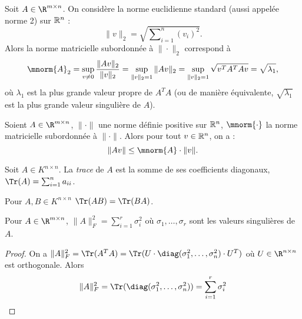 \begin{example}
	Soit $A \in \R^{m \times n}$. On considère la norme euclidienne standard (aussi appelée norme 2) sur $\Bbb R^n$ : 
	$$\| v \|_2 = \sqrt{\sum\nolimits_{i=1}^n (v_i)^2}.$$
	Alors la norme matricielle subordonnée à $\|\cdot\|_2$ correspond à
	\begin{displaymath}
    	\mnorm{A}_2 = \sup_{v \neq 0} \frac{\|Av\|_2}{\|v\|_2} = \sup_{\|v\|_2 = 1} \|Av\|_2 = \sup_{\|v\|_2 = 1} \sqrt{v^T A^T A v} = \sqrt{\lambda_1},
  	\end{displaymath}
  	où $\lambda_1$ est la plus grande valeur propre de $A^T A$ (ou de manière équivalente, $\sqrt{\lambda_1}$ est la plus grande valeur singulière de $A$).
\end{example}

\begin{exercise}
	Soient $A \in \R^{m \times n}$, $\|\cdot\|$ une norme définie positive sur $\Bbb R^n$, $\mnorm{\cdot}$ la norme matricielle subordonnée à $\|\cdot\|$. Alors pour tout $v \in \Bbb R^n$, on a : 
	\begin{displaymath}
		\|Av\| \leq \mnorm{A} \cdot \|v\|.
	\end{displaymath}
\end{exercise}

\begin{definition}
  \label{def:27}
  Soit $A \in K^{n \times n}$. La \emph{trace} de $A$ est la somme de ses coefficients diagonaux, $\Tr(A) = \sum_{i=1}^n a_{ii}$. 
\end{definition}

\begin{lemma}
  \label{lem:11}
  Pour $A,B \in K^{n \times n}$ $\Tr(AB) = \Tr(BA)$. 
\end{lemma}


\begin{lemma}
  \label{lem:10}
  Pour $A \in \R^{m \times n}$, $\|A\|_F^2 = \sum_{i=1}^r \sigma_i^2$ où $\sigma_1, \dots, \sigma_r$ sont les valeurs singulières de $A$. 
\end{lemma}

\begin{proof}
  On a $\|A\|_F^2 = \Tr(A^TA) = \Tr(U \cdot \diag(\sigma_1^2,\dots,\sigma_n^2) \cdot  U^T)$ où $U \in \R^{n \times n}$ est orthogonale. Alors 
  \begin{displaymath}
    \|A\|_F^2 = \Tr(\diag(\sigma_1^2,\dots,\sigma_n^2)) =  \sum_{i=1}^r \sigma_i^2
  \end{displaymath}
\end{proof}




